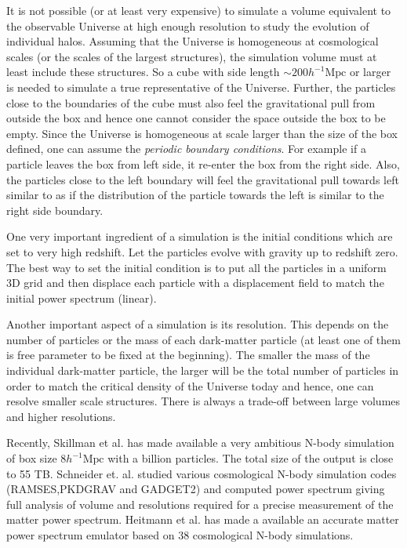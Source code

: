 \documentclass[
  11pt,
  twoside,
  openright,
  titlepage,
  headings=optiontoheadandtoc
]{scrbook}
\begin{document}
It is not possible (or at least very expensive) to simulate a volume equivalent to the
observable Universe at high enough resolution to study the evolution of individual
halos. Assuming that the Universe is homogeneous
at cosmological scales (or the scales of the largest structures), the simulation
volume must at least include these structures. So a cube with side length $\sim 200h^{-1} \mathrm{Mpc}$
or larger is needed to simulate a true representative of the Universe. Further, the
particles close to the boundaries of the cube must also feel the gravitational pull
from outside the box and hence one cannot consider the space outside the box to be 
empty. Since the Universe is homogeneous at scale larger than the size of the box defined, one
can assume the {\it periodic boundary conditions}. For example if a particle leaves the box from left
side, it re-enter the box from the right side. Also, the particles close to the left boundary
will feel the gravitational pull towards left similar to as if the distribution of the particle
towards the left is similar to the right side boundary.

One very important ingredient of a simulation is the initial conditions which are
set to very high redshift. Let the particles evolve with gravity up to redshift zero. 
The best way to set the initial condition is to put all the particles in a uniform 3D grid
and then displace each particle with a displacement field to match the initial power 
spectrum (linear). 

Another important aspect of a simulation is its resolution. This depends on the number of
particles or the mass of each dark-matter particle (at least one of them is free parameter 
to be fixed at the beginning). The smaller the mass of the individual dark-matter particle, the
larger will be the total number of particles in order to match the critical density of 
the Universe today and hence, one can resolve smaller scale structures. 
There is always a trade-off between large volumes and higher resolutions. 


Recently, Skillman et al. \cite{2014arXiv1407.2600S} has made available
a very ambitious N-body simulation of box size $8 h^{-1} \mathrm{Mpc}$ with
a billion particles. The total size of the output is close to 55 TB.
Schneider et. al. \cite{2015arXiv150305920S} studied various cosmological
N-body simulation codes (RAMSES,PKDGRAV and GADGET2) and computed power 
spectrum giving full analysis of volume and resolutions required for 
a precise measurement of the matter power spectrum.
Heitmann et al. \cite{2009ApJ...705..156H,2010ApJ...715..104H,
2010ApJ...713.1322L,2014ApJ...780..111H} has made a available an accurate matter power spectrum
emulator based on 38 cosmological N-body simulations. 
\end{document}
